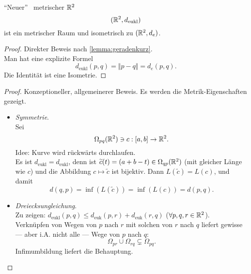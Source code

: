 \begin{theorem}{``Neuer'' \ metrischer $ \mathbb{R}^2 $}
  \begin{equation*}
    (\mathbb{R}^2, d_\text{eukl})
  \end{equation*}
  ist ein metrischer Raum und isometrisch zu $ (\mathbb{R}^2, d_e) $.
  \begin{proof}
    Direkter Beweis nach \autoref{lemma:geradenkurz}. \\
    Man hat eine explizite Formel
    \begin{equation*}
      d_{\text{eukl}}(p,q) = \Vert p - q \Vert = d_e(p,q)\text{.}
    \end{equation*}
    Die Identität ist eine Isometrie.
  \end{proof}
  \begin{proof}
    Konzeptioneller, allgemeinerer Beweis. Es werden die Metrik-Eigenschaften gezeigt. \\
    \begin{itemize}
      \item \emph{Symmetrie}. \\
        Sei
        \begin{equation*}
          \Omega_{pq}(\mathbb{R}^2) \ni c: [a,b] \to \mathbb{R}^2\text{.}
       \end{equation*}
       Idee: Kurve wird rückwärts durchlaufen. \\
       Es ist $ d_\text{eukl} = d_\text{eukl} $, denn ist $ \widetilde{c}(t) = (a+b-t) \in \Omega_{qp}(\mathbb{R}^2) $ (mit gleicher Länge wie $ c $) und die Abbildung $ c \mapsto \widetilde{c} $ ist bijektiv. Dann $ L(\widetilde{c}) = L(c) $, und damit
       \begin{equation*}
         d(q,p) = \inf(L(\widetilde{c})) = \inf(L(c)) = d(p,q)\text{.}
       \end{equation*}

      \item \emph{Dreiecksungleichung}. \\
        Zu zeigen: $ d_\text{eukl}(p,q) \leq d_\text{euk}(p,r) + d_\text{euk}(r,q) $ ($ \forall p, q, r \in \mathbb{R}^2 $). \\
        Verknüpfen von Wegen von $ p $ nach $ r $ mit solchen von $ r $ nach $ q $ liefert gewisse --- aber i.A. nicht alle --- Wege von $ p $ nach $ q $:
        \begin{equation*}
          \Omega_{pr} \cup \Omega_{rq} \subsetneq \Omega_{pq}\text{.}
        \end{equation*}
        Infimumbildung liefert die Behauptung.


\end{itemize}
\end{proof}
\end{theorem}
